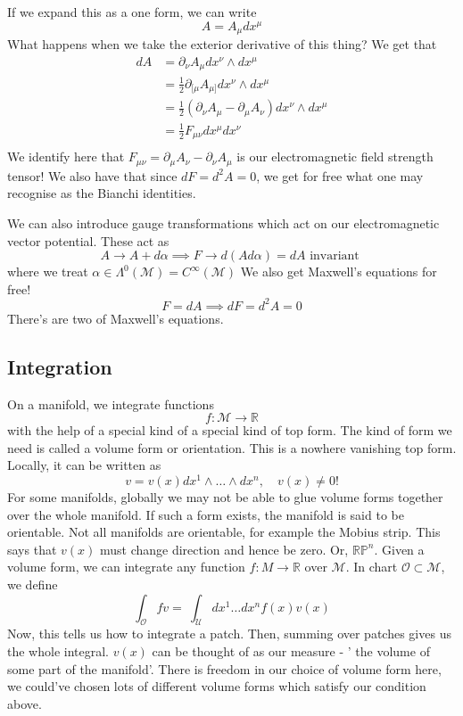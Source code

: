 \documentclass[11pt, a4paper]{article}   	%
\theoremstyle{slplain}
\begin{document}
If we expand this as a one form, we can write 
\[
 A = A_ \mu dx^ \mu 
\] 
What happens when we take the exterior 
derivative of this thing? 
We get that 
\begin{align*}
	dA &= \partial  _ \nu A _ \mu dx^ \nu \wedge  dx ^ \mu   \\
	   &=  \frac{1}{2 } \partial _{ [ \mu } A _{ \mu ] } dx^ \nu \wedge  dx ^ \mu \\ 
	   &=  \frac{1}{2 } \left(  \partial  _ \nu A _ \mu - \partial  _ \mu 
	   A _ \nu  \right) dx^ \nu \wedge dx ^ \mu \\
	   &=  \frac{1}{2 } F_{ \mu  \nu  } dx^ \mu  dx ^ \nu  \\
\end{align*} 
We identify here that $ F_{ \mu \nu} = \partial  _ \mu A _ \nu - \partial  _ \nu A _ \mu $ 
is our electromagnetic field strength tensor! 
We also have that since $ d F = d ^2 A = 0 $, 
we get for free what one may recognise as the Bianchi 
identities. 

We can also introduce gauge transformations
which act on our electromagnetic 
vector potential. These act as 
\[
A\to A+ d\alpha  \implies F \to d ( A d\alpha ) = dA \text{ invariant } 
\] where we treat $ \alpha \in \Lambda^ 0 ( \mathcal{ M } ) = C^\infty ( \mathcal{ M }) $
We also get Maxwell's equations for free! 
\[
F = dA \implies dF = d^ 2 A = 0
\] There's are two of Maxwell's equations. 

\subsection{Integration} 
On a manifold, we integrate functions 
\[
	f : \mathcal{ M } \to \mathbb{ R } 
\] with the help of a special kind of 
a special kind of top form. 
The kind of form we need is called a volume form or orientation. 
This is a nowhere vanishing top form. Locally, 
it can be written as 
\[
v = v ( x) dx^ 1 \wedge  \dots \wedge  dx^ n , \quad v ( x) \neq 0 !
\] For some manifolds, globally we may not be able to glue
volume forms together over the whole manifold. 
If such a form exists, the manifold is said to be orientable. 
Not all manifolds are orientable, for example the Mobius strip. 
This says that $ v( x) $ must change direction and hence be zero. 
Or, $ \mathbb { RP } ^ n $. 
Given a volume form, we can integrate 
any function  $f: M \to \mathbb{ R} $ over  $ \mathcal{ M } $. 
In chart $ \mathcal{ O } \subset \mathcal{ M } $, we define
\[
\int_{ \mathcal{ O } } f v =  \ \int_{\mathcal{ U } } dx^ 1 \dots dx^ n f( x) v( x) 
\] Now, this tells us how to integrate a patch. 
Then, summing over patches gives us the whole integral. 
$ v ( x) $ can be thought of as our measure - ' the volume of some part of 
the manifold'. There is freedom in our choice of volume form here, 
we could've chosen lots of different volume forms which 
satisfy our condition above.
\end{document}
